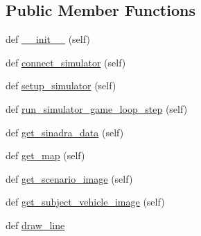 \subsection*{Public Member Functions}
\begin{DoxyCompactItemize}
\item 
def \hyperlink{classimplementation_1_1simulators_1_1carla__simulator__controller_1_1_carla_simulator_controller_a36c29b90d6b1e73a76708a43eae68d1b}{\+\_\+\+\_\+init\+\_\+\+\_\+} (self)
\item 
def \hyperlink{classimplementation_1_1simulators_1_1carla__simulator__controller_1_1_carla_simulator_controller_a882ed4e896eef439a7862918b7ce0554}{connect\+\_\+simulator} (self)
\item 
def \hyperlink{classimplementation_1_1simulators_1_1carla__simulator__controller_1_1_carla_simulator_controller_abcfd1135fe7f8766890e5d20026791ef}{setup\+\_\+simulator} (self)
\item 
def \hyperlink{classimplementation_1_1simulators_1_1carla__simulator__controller_1_1_carla_simulator_controller_a263bf046ef60543b169d0d57a37e19dc}{run\+\_\+simulator\+\_\+game\+\_\+loop\+\_\+step} (self)
\item 
def \hyperlink{classimplementation_1_1simulators_1_1carla__simulator__controller_1_1_carla_simulator_controller_acd9f676fe9ce1919082465f130fadca5}{get\+\_\+sinadra\+\_\+data} (self)
\item 
def \hyperlink{classimplementation_1_1simulators_1_1carla__simulator__controller_1_1_carla_simulator_controller_a1fb507d72c2d010afbd4c3d10233668f}{get\+\_\+map} (self)
\item 
def \hyperlink{classimplementation_1_1simulators_1_1carla__simulator__controller_1_1_carla_simulator_controller_a34d719c9138b275d2bb9bd95dc5b0b34}{get\+\_\+scenario\+\_\+image} (self)
\item 
def \hyperlink{classimplementation_1_1simulators_1_1carla__simulator__controller_1_1_carla_simulator_controller_ade6f01523776f3e73bd33ccde1ac35e5}{get\+\_\+subject\+\_\+vehicle\+\_\+image} (self)
\item 
def \hyperlink{classimplementation_1_1simulators_1_1carla__simulator__controller_1_1_carla_simulator_controller_abb9bd3085d08a6b2ad2d7e72f2cd2435}{draw\+\_\+line}
\end{DoxyCompactItemize}


